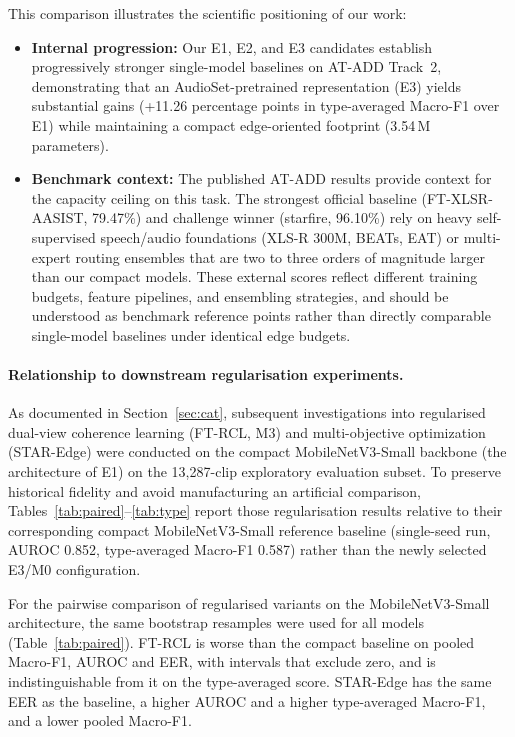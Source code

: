 This comparison illustrates the scientific positioning of our work:
\begin{itemize}
  \item \textbf{Internal progression:} Our E1, E2, and E3 candidates establish progressively stronger single-model baselines on AT-ADD Track~2, demonstrating that an AudioSet-pretrained representation (E3) yields substantial gains (+11.26 percentage points in type-averaged Macro-F1 over E1) while maintaining a compact edge-oriented footprint (3.54\,M parameters).
  \item \textbf{Benchmark context:} The published AT-ADD results provide context for the capacity ceiling on this task. The strongest official baseline (FT-XLSR-AASIST, 79.47\%) and challenge winner (starfire, 96.10\%) rely on heavy self-supervised speech/audio foundations (XLS-R 300M, BEATs, EAT) or multi-expert routing ensembles that are two to three orders of magnitude larger than our compact models. These external scores reflect different training budgets, feature pipelines, and ensembling strategies, and should be understood as benchmark reference points rather than directly comparable single-model baselines under identical edge budgets.
\end{itemize}

\paragraph{Relationship to downstream regularisation experiments.} As documented in Section~\ref{sec:cat}, subsequent investigations into regularised dual-view coherence learning (FT-RCL, M3) and multi-objective optimization (STAR-Edge) were conducted on the compact MobileNetV3-Small backbone (the architecture of E1) on the 13{,}287-clip exploratory evaluation subset. To preserve historical fidelity and avoid manufacturing an artificial comparison, Tables~\ref{tab:paired}--\ref{tab:type} report those regularisation results relative to their corresponding compact MobileNetV3-Small reference baseline (single-seed run, AUROC 0.852, type-averaged Macro-F1 0.587) rather than the newly selected E3/M0 configuration.

For the pairwise comparison of regularised variants on the MobileNetV3-Small architecture, the same bootstrap resamples were used for all models (Table~\ref{tab:paired}). FT-RCL is worse than the compact baseline on pooled Macro-F1, AUROC and EER, with intervals that exclude zero, and is indistinguishable from it on the type-averaged score. STAR-Edge has the same EER as the baseline, a higher AUROC and a higher type-averaged Macro-F1, and a lower pooled Macro-F1.


